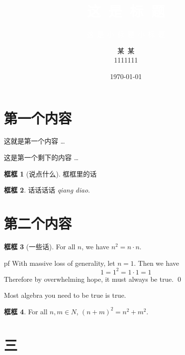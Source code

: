 \documentclass{beamer}
\title{\textcolor{white}{这\ 是\ 标\ 题}}
\subtitle{\textcolor{white}{这\ 是\ 小\ 标\ 题\ 小\ 标\ 题}}
\author{某\ 某\\ 1111111}
\date{\today}
\theoremstyle{definition}
\newtheorem{框}{框框}[section]
\numberwithin{equation}{section}
\begin{document}
	
	
	\begin{frame}
		\titlepage
	\end{frame}
	
	
	
	\section{第一个内容}
	
	
	
	 
	\begin{frame}
		这就是第一个内容 \dots
	\end{frame}
	
	
	
	\begin{frame}
		这是第一个剩下的内容 \dots
		
		\begin{框}[说点什么]
			框框里的话
		\end{框}
		
		\begin{框}
			话话话话 \emph{qiang diao}.
		\end{框}
	\end{frame}
	
	
	
	\section{第二个内容}
	
	
	
	\begin{frame}
		\begin{框}[一些话]
			For all $n$, we have $n^2= n \cdot n$.
		\end{框}
		
		pf With massive loss of generality, let $n=1$. Then we have
		\[
		1=1^2= 1 \cdot 1= 1
		\]
		Therefore by overwhelming hope, it must always be true. \qed
	\end{frame}
	
	
	

	\begin{frame}
		Most algebra you need to be true is true.
		\begin{框}
			For all $n,m \in N$, $(n+m)^2= n^2 + m^2$.
		\end{框}
	\end{frame}
	
	
	
	\section{三}
	
\end{document}
